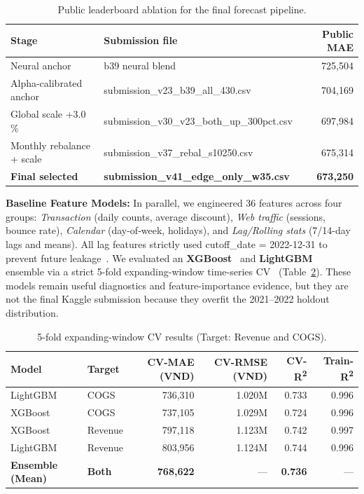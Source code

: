 \documentclass[10pt]{article}
\begin{document}
\begin{table}[t]
\centering
\caption{Public leaderboard ablation for the final forecast pipeline.}
\label{tab:lb_ablation}
\small
\setlength{\tabcolsep}{5pt}
\begin{tabular}{llr}
\toprule
\textbf{Stage} & \textbf{Submission file} & \textbf{Public MAE}\\
\midrule
Neural anchor & b39 neural blend & 725{,}504\\
Alpha-calibrated anchor & submission\_v23\_b39\_all\_430.csv & 704{,}169\\
Global scale +3.0\,\% & submission\_v30\_v23\_both\_up\_300pct.csv & 697{,}984\\
Monthly rebalance + scale & submission\_v37\_rebal\_s10250.csv & 675{,}314\\
\textbf{Final selected} & \textbf{submission\_v41\_edge\_only\_w35.csv} & \textbf{673{,}250}\\
\bottomrule
\end{tabular}
\end{table}

\textbf{Baseline Feature Models:} In parallel, we engineered 36 features across four groups: \textit{Transaction} (daily counts, average discount), \textit{Web traffic} (sessions, bounce rate), \textit{Calendar} (day-of-week, holidays), and \textit{Lag/Rolling stats} (7/14-day lags and means). All lag features strictly used cutoff\_date = 2022-12-31 to prevent future leakage~\cite{hyndman2018forecasting}. We evaluated an \textbf{XGBoost}~\cite{chen2016xgboost} and \textbf{LightGBM}~\cite{ke2017lightgbm} ensemble via a strict 5-fold expanding-window time-series CV~\cite{bergmeir2018timeseries} (Table~\ref{tab:cv}). These models remain useful diagnostics and feature-importance evidence, but they are not the final Kaggle submission because they overfit the 2021--2022 holdout distribution.

\begin{table}[t]
\centering
\caption{5-fold expanding-window CV results (Target: Revenue and COGS).}
\label{tab:cv}
\small
\setlength{\tabcolsep}{7pt}
\begin{tabular}{llrrrr}
\toprule
\textbf{Model} & \textbf{Target} & \textbf{CV-MAE (VND)} & \textbf{CV-RMSE (VND)} & \textbf{CV-R\textsuperscript{2}} & \textbf{Train-R\textsuperscript{2}}\\
\midrule
LightGBM & COGS    & 736{,}310 & 1.020M & 0.733 & 0.996\\
XGBoost  & COGS    & 737{,}105 & 1.029M & 0.724 & 0.996\\
XGBoost  & Revenue & 797{,}118 & 1.123M & 0.742 & 0.997\\
LightGBM & Revenue & 803{,}956 & 1.124M & 0.744 & 0.996\\
\midrule
\textbf{Ensemble (Mean)} & \textbf{Both} & \textbf{768{,}622} & --- & \textbf{0.736} & ---\\
\bottomrule
\end{tabular}
\end{table}
\end{document}
